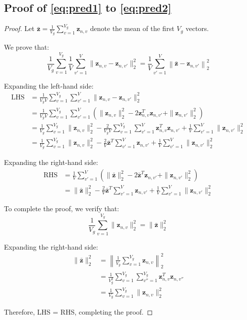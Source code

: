 \subsection{Proof of \cref{eq:pred1} to \cref{eq:pred2}}
\label{proof:pred}
\begin{proof}
Let $\bar{\mathbf{z}} = \frac{1}{V_g}\sum_{v=1}^{V_g}\mathbf{z}_{n,v}$ denote the mean of the first $V_g$ vectors.

We prove that:
\begin{equation}
\frac{1}{V_g}\sum_{v=1}^{V_g}\frac{1}{V}\sum_{v'=1}^{V}\| \mathbf{z}_{n,v} - \mathbf{z}_{n,v'} \|_2^2 = \frac{1}{V}\sum_{v'=1}^{V}\left\| \bar{\mathbf{z}} - \mathbf{z}_{n,v'} \right\|_2^2
\end{equation}

Expanding the left-hand side:
\begin{align}
\text{LHS} &= \frac{1}{V_g V}\sum_{v=1}^{V_g}\sum_{v'=1}^{V}\| \mathbf{z}_{n,v} - \mathbf{z}_{n,v'} \|_2^2 \\
&= \frac{1}{V_g V}\sum_{v=1}^{V_g}\sum_{v'=1}^{V}\left(\|\mathbf{z}_{n,v}\|_2^2 - 2\mathbf{z}_{n,v}^T\mathbf{z}_{n,v'} + \|\mathbf{z}_{n,v'}\|_2^2\right) \\
&= \frac{1}{V_g}\sum_{v=1}^{V_g}\|\mathbf{z}_{n,v}\|_2^2 - \frac{2}{V_g V}\sum_{v=1}^{V_g}\sum_{v'=1}^{V}\mathbf{z}_{n,v}^T\mathbf{z}_{n,v'} + \frac{1}{V}\sum_{v'=1}^{V}\|\mathbf{z}_{n,v'}\|_2^2 \\
&= \frac{1}{V_g}\sum_{v=1}^{V_g}\|\mathbf{z}_{n,v}\|_2^2 - \frac{2}{V}\bar{\mathbf{z}}^T\sum_{v'=1}^{V}\mathbf{z}_{n,v'} + \frac{1}{V}\sum_{v'=1}^{V}\|\mathbf{z}_{n,v'}\|_2^2
\end{align}

Expanding the right-hand side:
\begin{align}
\text{RHS} &= \frac{1}{V}\sum_{v'=1}^{V}\left(\|\bar{\mathbf{z}}\|_2^2 - 2\bar{\mathbf{z}}^T\mathbf{z}_{n,v'} + \|\mathbf{z}_{n,v'}\|_2^2\right) \\
&= \|\bar{\mathbf{z}}\|_2^2 - \frac{2}{V}\bar{\mathbf{z}}^T\sum_{v'=1}^{V}\mathbf{z}_{n,v'} + \frac{1}{V}\sum_{v'=1}^{V}\|\mathbf{z}_{n,v'}\|_2^2
\end{align}

To complete the proof, we verify that:
\begin{equation}
\frac{1}{V_g}\sum_{v=1}^{V_g}\|\mathbf{z}_{n,v}\|_2^2 = \|\bar{\mathbf{z}}\|_2^2
\end{equation}

Expanding the right-hand side:
\begin{align}
\|\bar{\mathbf{z}}\|_2^2 &= \left\|\frac{1}{V_g}\sum_{v=1}^{V_g}\mathbf{z}_{n,v}\right\|_2^2 \\
&= \frac{1}{V_g^2}\sum_{v=1}^{V_g}\sum_{v''=1}^{V_g}\mathbf{z}_{n,v}^T\mathbf{z}_{n,v''} \\
&= \frac{1}{V_g}\sum_{v=1}^{V_g}\|\mathbf{z}_{n,v}\|_2^2
\end{align}

Therefore, LHS = RHS, completing the proof.
\end{proof}



